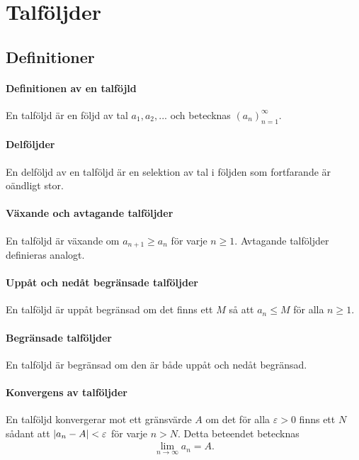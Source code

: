 \section{Talföljder}

\subsection{Definitioner}

\paragraph{Definitionen av en talföjld}
En talföljd är en följd av tal $a_1, a_2, ...$ och betecknas $\left(a_n\right)_{n = 1}^\infty$.

\paragraph{Delföljder}
En delföljd av en talföljd är en selektion av tal i följden som fortfarande är oändligt stor.

\paragraph{Växande och avtagande talföljder}
En talföljd är växande om $a_{n + 1} \geq a_n$ för varje $n \geq 1$. Avtagande talföljder definieras analogt.

\paragraph{Uppåt och nedåt begränsade talföljder}
En talföljd är uppåt begränsad om det finns ett $M$ så att $a_n \leq M$ för alla $n \geq 1$.

\paragraph{Begränsade talföljder}
En talföljd är begränsad om den är både uppåt och nedåt begränsad.

\paragraph{Konvergens av talföljder}
En talföljd konvergerar mot ett gränsvärde $A$ om det för alla $\varepsilon > 0$ finns ett $N$ sådant att $\abs{a_n - A} < \varepsilon$ för varje $n > N$. Detta beteendet betecknas
\begin{align*}
	\lim_{n\to\infty} a_n = A.
\end{align*}

